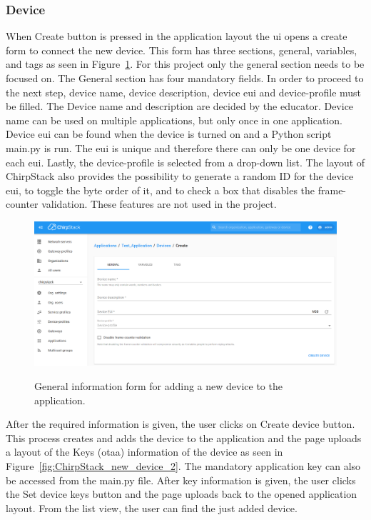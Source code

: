 \subsubsection{Device}
When Create button is pressed in the application layout the \gls{ui} opens a create form to connect the new device.
This form has three sections, general, variables, and tags as seen in Figure~\ref{fig:ChirpStack_new_device}.
For this project only the general section needs to be focused on.
The General section has four mandatory fields.
In order to proceed to the next step, device name, device description, device \gls{eui} and device-profile must be filled.
The Device name and description are decided by the educator.
Device name can be used on multiple applications, but only once in one application.
Device \gls{eui} can be found when the device is turned on and a Python script main.py is run.
The \gls{eui} is unique and therefore there can only be one device for each \gls{eui}.
Lastly, the device-profile is selected from a drop-down list.
The layout of ChirpStack also provides the possibility to generate a random ID for the device \gls{eui}, to toggle the byte order of it, and to check a box that disables the frame-counter validation.
These features are not used in the project.

\clearpage

\begin{figure}[ht]
  \centering
  {\includegraphics[width=\textwidth]{illustration/ChirpStack_new_device.png}}
  \caption{General information form for adding a new device to the application.}
  \label{fig:ChirpStack_new_device}
\end{figure}

After the required information is given, the user clicks on Create device button.
This process creates and adds the device to the application and the page uploads a layout of the Keys (\gls{otaa}) information of the device as seen in Figure~\ref{fig:ChirpStack_new_device_2}.
The mandatory application key can also be accessed from the main.py file.
After key information is given, the user clicks the Set device keys button and the page uploads back to the opened application layout.
From the list view, the user can find the just added device.

